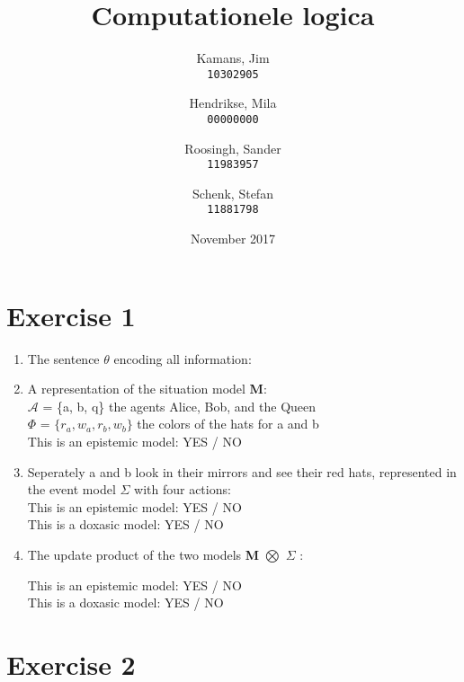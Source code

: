 \documentclass[leqno]{article}
\title{Computationele logica}
\author{
    \small Kamans, Jim\\
    \texttt{10302905}
    \and
    \small Hendrikse, Mila\\
    \texttt{00000000}
    \and
    \small Roosingh, Sander\\
    \texttt{11983957}
    \and
    \small Schenk, Stefan\\
    \texttt{11881798}
}
\date{November 2017}
\begin{document}
\maketitle

\section{Exercise 1}

\begin{enumerate}
    \item The sentence $\theta$ encoding all information:

    \item A representation of the situation model \textbf{M}: \\
    $\mathcal{A}$ = \{a, b, q\} the agents Alice, Bob, and the Queen \\
    $\Phi$ = $\{r_a, w_a, r_b, w_b\}$ the colors of the hats for a and b \\

    This is an epistemic model: YES / NO \\

    \item Seperately a and b look in their mirrors and see their red hats, represented in the event model $\Sigma$ with four actions: \\

    This is an epistemic model: YES / NO \\
    This is a doxasic model: YES / NO \\

    \item The update product of the two models \textbf{M} $\bigotimes$ $\Sigma$ :

    This is an epistemic model: YES / NO \\
    This is a doxasic model: YES / NO \\


\end{enumerate}

\section{Exercise 2}
\end{document}
